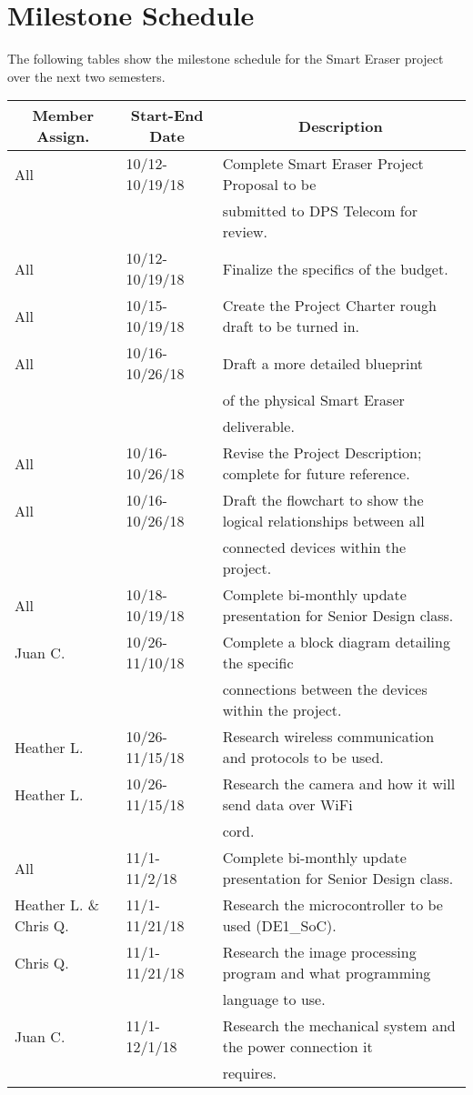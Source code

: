 \section{Milestone Schedule}
The following tables show the milestone schedule for the Smart Eraser project over the next two semesters.
\setlength{\parindent}{5ex}
\begin{table} [H]	
	\normalsize
	\centering
	\begin{tabular}{|l|l|l|}
		\hline
		\multicolumn{1}{|c|}{\textbf{Member Assign.}} & \multicolumn{1}{|c|}{\textbf{Start-End Date}} & \multicolumn{1}{|c|}{\textbf{Description}} \\
		\hline
		All & 10/12-10/19/18 & Complete Smart Eraser Project Proposal to be\\
		& & submitted to DPS Telecom for review. \\
		\hline
		All & 10/12-10/19/18 & Finalize the specifics of the budget. \\
		\hline
		All & 10/15-10/19/18 & 
		Create the Project Charter rough draft to be turned in.\\
		\hline
		All & 10/16-10/26/18 & Draft a more detailed blueprint \\
		& &of the physical Smart Eraser \\
		& & deliverable. \\
		\hline
		All & 10/16-10/26/18 & 
		Revise the Project Description; complete for future reference.\\
		\hline
		All & 10/16-10/26/18 & 
		Draft the flowchart to show the logical relationships between all \\
		& & connected devices within the project.\\
		\hline
		All & 10/18-10/19/18 & 
		Complete bi-monthly update presentation for Senior Design class.\\
		\hline
		Juan C. & 10/26-11/10/18 & 
		Complete a block diagram detailing the specific \\
		& & connections between the devices within the project.\\
		\hline
		Heather L. & 10/26-11/15/18 & 
		Research wireless communication and protocols to be used.\\
		\hline
		Heather L. & 10/26-11/15/18 & 
		Research the camera and how it will send data over WiFi \\
		& & cord.\\
		\hline
		All & 11/1-11/2/18 & 
		Complete bi-monthly update presentation for Senior Design class.\\
		\hline
		Heather L. \& Chris Q. & 11/1-11/21/18 & 
		Research the microcontroller to be used  (DE1\_SoC).\\
		\hline
		Chris Q. & 11/1-11/21/18 & 
		Research the image processing program and what programming \\
		& & language to use.\\
		\hline
		Juan C. & 11/1-12/1/18 &
		Research the mechanical system and the power connection it \\
		& &requires. \\
		\hline
		

\end{tabular}
\end{table}
